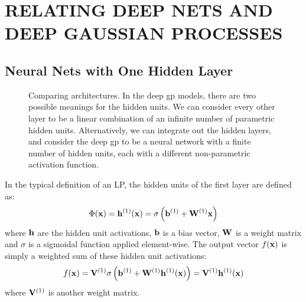\documentclass[twoside]{article}
\makeatletter
\newlength{\nonHumbleHeight}
\def\@humbleformat#1{{\settoheight{\nonHumbleHeight}{#1}\resizebox{!}{0.94\nonHumbleHeight}{#1}}}%
\def\humble#1{\@humbleformat{#1}}%
\newcommand{\gp}{{\humble GP}}
\newcommand{\gpt}{{\sc gp}}
\newcommand{\MLP}{{\humble MLP}}
\newcommand{\sectiondist}{}
\makeatother
\begin{document}
\section{RELATING DEEP NETS AND DEEP GAUSSIAN PROCESSES}
\label{sec:relating}
\sectiondist


\subsection{Neural Nets with One Hidden Layer}

\begin{figure}

\caption{Comparing architectures.
In the deep \gpt{} models, there are two possible meanings for the hidden units.  
We can consider every other layer to be a linear combination of an infinite number of parametric hidden units. Alternatively, we can integrate out the hidden layers, and consider the deep \gpt{} to be a neural network with a finite number of hidden units, each with a different non-parametric activation function.}
\label{fig:architectures}
\end{figure}

In the typical definition of an \MLP{}, the hidden units of the first layer are defined as:
%
\begin{align}
\Phi({\bf{x}}) = {\bf{h}}^{(1)}({\bf{x}}) = \sigma \left( {\bf{b}}^{(1)} + \mathbf{W}^{(1)}{\bf{x}} \right)
\end{align}
%
where ${\bf{h}}$ are the hidden unit activations, ${\bf{b}}$ is a bias vector, $\mathbf{W}$ is a weight matrix and $\sigma$ is a sigmoidal function applied element-wise. The output vector $f({\bf{x}})$ is simply a weighted sum of these hidden unit activations:
%
\begin{align}
f({\bf{x}}) = \mathbf{V}^{(1)} \sigma \left( {\bf{b}}^{(1)} + \mathbf{W}^{(1)} {\bf{h}}^{(1)}({\bf{x}}) \right)  = \mathbf{V}^{(1)} {\bf{h}}^{(1)}({\bf{x}}) 
\end{align}
%
where $\mathbf{V}^{(1)}$ is another weight matrix.
\end{document}
